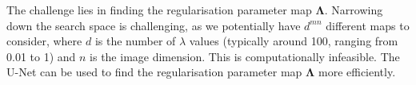 \documentclass[12pt]{article}
\begin{document}












The challenge lies in finding the regularisation parameter map $\mathbf{\Lambda}$.  
Narrowing down the search space is challenging, as we potentially have $d^{m n}$ different maps to consider, where $d$ is the number of $\lambda$ values (typically around 100, ranging from 0.01 to 1) and $n$ is the image dimension. This is computationally infeasible. The U-Net can be used to find the 
regularisation parameter map $\mathbf{\Lambda}$
more efficiently.
\end{document}
